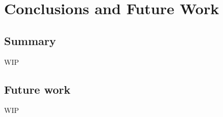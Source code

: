 \chapter{Conclusions and Future Work}
\label{chap:conclusion}
\chaptoc{}


\newpage
\section{Summary}
\label{sec:summary}
\begin{colsection}


\begin{colsection}

WIP

\end{colsection}


\end{colsection}


\newpage
\section{Future work}
\label{sec:future}
\begin{colsection}


\begin{colsection}

WIP
\citep{GW150914, GW150914_followup, GW151226}


\end{colsection}


\end{colsection}

